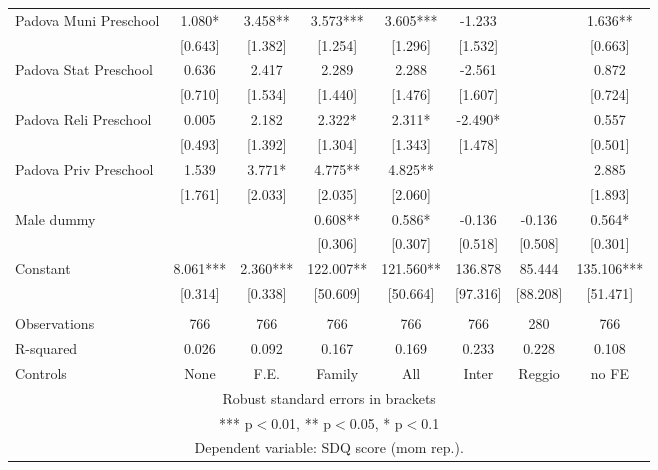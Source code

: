 \begin{tabular}{lccccccc}
Padova Muni Preschool & 1.080* & 3.458** & 3.573*** & 3.605*** & -1.233 &  & 1.636** \\
 & [0.643] & [1.382] & [1.254] & [1.296] & [1.532] &  & [0.663] \\
Padova Stat Preschool & 0.636 & 2.417 & 2.289 & 2.288 & -2.561 &  & 0.872 \\
 & [0.710] & [1.534] & [1.440] & [1.476] & [1.607] &  & [0.724] \\
Padova Reli Preschool & 0.005 & 2.182 & 2.322* & 2.311* & -2.490* &  & 0.557 \\
 & [0.493] & [1.392] & [1.304] & [1.343] & [1.478] &  & [0.501] \\
Padova Priv Preschool & 1.539 & 3.771* & 4.775** & 4.825** &  &  & 2.885 \\
 & [1.761] & [2.033] & [2.035] & [2.060] &  &  & [1.893] \\
Male dummy &  &  & 0.608** & 0.586* & -0.136 & -0.136 & 0.564* \\
 &  &  & [0.306] & [0.307] & [0.518] & [0.508] & [0.301] \\
Constant & 8.061*** & 2.360*** & 122.007** & 121.560** & 136.878 & 85.444 & 135.106*** \\
 & [0.314] & [0.338] & [50.609] & [50.664] & [97.316] & [88.208] & [51.471] \\
 &  &  &  &  &  &  &  \\
Observations & 766 & 766 & 766 & 766 & 766 & 280 & 766 \\
R-squared & 0.026 & 0.092 & 0.167 & 0.169 & 0.233 & 0.228 & 0.108 \\
 Controls & None & F.E. & Family & All & Inter & Reggio & no FE \\ \hline
\multicolumn{8}{c}{ Robust standard errors in brackets} \\
\multicolumn{8}{c}{ *** p$<$0.01, ** p$<$0.05, * p$<$0.1} \\
\multicolumn{8}{c}{ Dependent variable: SDQ score (mom rep.).} \\
\end{tabular}
